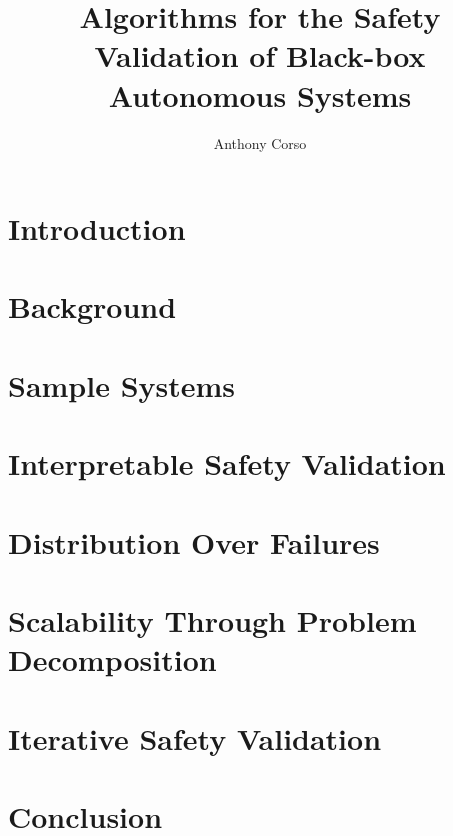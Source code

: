 \documentclass[12pt,letterpaper]{report}
\title{Algorithms for the Safety Validation of Black-box Autonomous Systems}
\author{Anthony Corso}
\begin{document}
\beforepreface





\afterpreface

\chapter{Introduction}


\chapter{Background}
\label{ch2}


\chapter{Sample Systems}
\label{ch3}


\chapter{Interpretable Safety Validation}
\label{ch4}


\chapter{Distribution Over Failures}
\label{ch5}


\chapter{Scalability Through Problem \\Decomposition}
\label{ch6}


\chapter{Iterative Safety Validation}
\label{ch7}


\chapter{Conclusion}


\printbibliography
\end{document}
